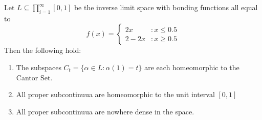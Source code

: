 



\begin{example}
Let $L\subseteq \prod_{i=1}^\infty [0,1]$ be the inverse limit space with bonding functions all equal to
\[
  f(x) = \left\{
     \begin{array}{lr}
       2x & : x \leq 0.5 \\
       2-2x & : x \geq 0.5
     \end{array}
   \right.
\]
Then the following hold:
  \begin{enumerate}
    \item The subspaces $C_t = \{\alpha\in L : \alpha(1)=t\}$ are each homeomorphic to the Cantor Set.
    \item All proper subcontinuua are homeomorphic to the unit interval $[0,1]$
    \item All proper subcontinuua are nowhere dense in the space.
  \end{enumerate}
\end{example}

